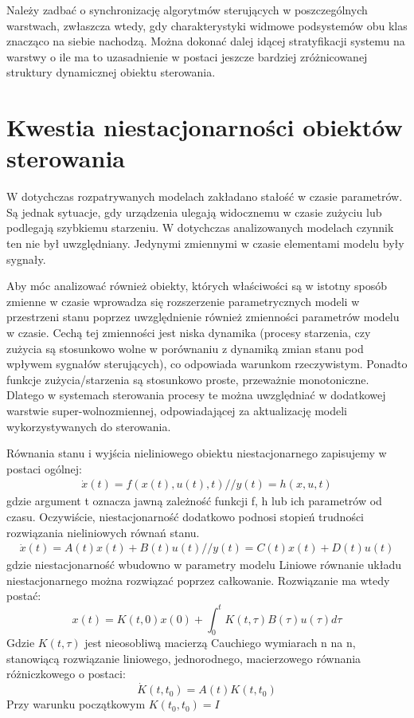 \documentclass{article}
\begin{document}
		Należy zadbać o synchronizację algorytmów sterujących w poszczególnych warstwach,
		zwłaszcza wtedy, gdy charakterystyki widmowe podsystemów obu klas znacząco na
		siebie nachodzą. Można dokonać dalej idącej stratyfikacji systemu na warstwy 
		o ile ma to uzasadnienie w postaci jeszcze bardziej zróżnicowanej struktury
		dynamicznej obiektu sterowania.
	\section{Kwestia niestacjonarności obiektów sterowania}
		W dotychczas rozpatrywanych modelach zakładano stałość w czasie parametrów. Są
		jednak sytuacje, gdy urządzenia ulegają widocznemu w czasie zużyciu lub podlegają
		szybkiemu starzeniu. W dotychczas analizowanych modelach czynnik ten nie był
		uwzględniany. Jedynymi zmiennymi w czasie elementami modelu były sygnały.

		Aby móc analizować również obiekty, których właściwości są w istotny sposób zmienne
		w czasie wprowadza się rozszerzenie parametrycznych modeli w przestrzeni stanu
		poprzez uwzględnienie również zmienności parametrów modelu w czasie. Cechą tej
		zmienności jest niska dynamika (procesy starzenia, czy zużycia są stosunkowo wolne w
		porównaniu z dynamiką zmian stanu pod wpływem sygnałów sterujących), co
		odpowiada warunkom rzeczywistym. Ponadto funkcje zużycia/starzenia są stosunkowo
		proste, przeważnie monotoniczne. Dlatego w systemach sterowania procesy te można
		uwzględniać w dodatkowej warstwie super-wolnozmiennej, odpowiadającej za
		aktualizację modeli wykorzystywanych do sterowania.
		
		Równania stanu i wyjścia nieliniowego obiektu niestacjonarnego zapisujemy w postaci
		ogólnej:
		\begin{align*}
			\dot{x}(t) = f(x(t), u(t), t) //
			y(t) = h(x,u,t)
		\end{align*}
		gdzie argument t oznacza jawną zależność funkcji f, h lub ich parametrów od czasu.
		Oczywiście, niestacjonarność dodatkowo podnosi stopień trudności rozwiązania
		nieliniowych równań stanu.
		\begin{align*}
			\dot{x}(t) = A(t) x(t) + B(t)u(t) //
			y(t) = C(t) x(t) + D(t) u(t)
		\end{align*}
		gdzie niestacjonarność wbudowno w parametry modelu
		Liniowe równanie układu niestacjonarnego można rozwiązać poprzez całkowanie.
		Rozwiązanie ma wtedy postać:
		\begin{equation}
			x(t) = K(t, 0)x(0) + \int^t_0K(t,\tau)B(\tau)u(\tau)d\tau
		\end{equation}
		Gdzie $K(t,\tau)$ jest nieosobliwą macierzą Cauchiego wymiarach n na n, stanowiącą
		rozwiązanie liniowego, jednorodnego, macierzowego równania różniczkowego o postaci:
		\begin{equation}
			\dot{K}(t, t_0) = A(t)K(t,t_0)
		\end{equation}
		Przy warunku początkowym $K(t_0, t_0) = I$
\end{document}
